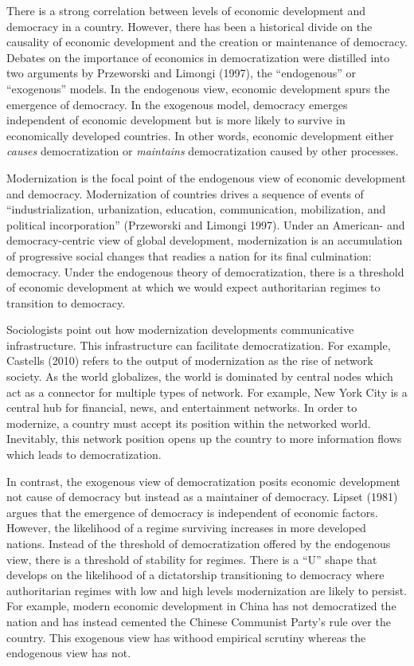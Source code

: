 \documentclass[12pt,]{article}
\begin{document}
There is a strong correlation between levels of economic development and
democracy in a country. However, there has been a historical divide on
the causality of economic development and the creation or maintenance of
democracy. Debates on the importance of economics in democratization
were distilled into two arguments by Przeworski and Limongi (1997), the
``endogenous'' or ``exogenous'' models. In the endogenous view, economic
development spurs the emergence of democracy. In the exogenous model,
democracy emerges independent of economic development but is more likely
to survive in economically developed countries. In other words, economic
development either \emph{causes} democratization or \emph{maintains}
democratization caused by other processes.

Modernization is the focal point of the endogenous view of economic
development and democracy. Modernization of countries drives a sequence
of events of ``industrialization, urbanization, education,
communication, mobilization, and political incorporation'' (Przeworski
and Limongi 1997). Under an American- and democracy-centric view of
global development, modernization is an accumulation of progressive
social changes that readies a nation for its final culmination:
democracy. Under the endogenous theory of democratization, there is a
threshold of economic development at which we would expect authoritarian
regimes to transition to democracy.

Sociologists point out how modernization developments communicative
infrastructure. This infrastructure can facilitate democratization. For
example, Castells (2010) refers to the output of modernization as the
rise of network society. As the world globalizes, the world is dominated
by central nodes which act as a connector for multiple types of network.
For example, New York City is a central hub for financial, news, and
entertainment networks. In order to modernize, a country must accept its
position within the networked world. Inevitably, this network position
opens up the country to more information flows which leads to
democratization.

In contrast, the exogenous view of democratization posits economic
development not cause of democracy but instead as a maintainer of
democracy. Lipset (1981) argues that the emergence of democracy is
independent of economic factors. However, the likelihood of a regime
surviving increases in more developed nations. Instead of the threshold
of democratization offered by the endogenous view, there is a threshold
of stability for regimes. There is a ``U'' shape that develops on the
likelihood of a dictatorship transitioning to democracy where
authoritarian regimes with low and high levels modernization are likely
to persist. For example, modern economic development in China has not
democratized the nation and has instead cemented the Chinese Communist
Party's rule over the country. This exogenous view has withood empirical
scrutiny whereas the endogenous view has not.
\end{document}
